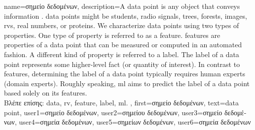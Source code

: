 
{name={\foreignlanguage{greek}{σημείο δεδομένων}},
description={A \gls{data} point is any object that conveys information \cite{coverthomas}. \Gls{data} points might be 
		students, radio signals, trees, forests, images, \gls{rv}s, real numbers, or proteins. We characterize \gls{data} points 
		using two types of properties. One type of property is referred to as a \gls{feature}. \Gls{feature}s are properties of a 
		\gls{data} point that can be measured or computed in an automated fashion. 
		A different kind of property is referred to a \gls{label}. The \gls{label} of 
		a \gls{data} point represents some higher-level fact (or quantity of interest). In 
		contrast to \gls{feature}s, determining the \gls{label} of a \gls{data} point typically 
		requires human experts (domain experts). Roughly speaking, \gls{ml} aims to predict 
		the \gls{label} of a \gls{data} point based solely on its \gls{feature}s.\\
		\foreignlanguage{greek}{Βλέπε επίσης:} \gls{data}, \gls{rv}, \gls{feature}, \gls{label}, \gls{ml}.
		}, 
		first={\foreignlanguage{greek}{σημείο δεδομένων}},
		text={data point},
		user1={\foreignlanguage{greek}{σημείο δεδομένων}}, %
		user2={\foreignlanguage{greek}{σημείου δεδομένων}}, %
		user3={\foreignlanguage{greek}{σημείο δεδομένων}}, %
		user4={\foreignlanguage{greek}{σημεία δεδομένων}}, %
		user5={\foreignlanguage{greek}{σημείων δεδομένων}}, %
		user6={\foreignlanguage{greek}{σημεία δεδομένων}} %
}


